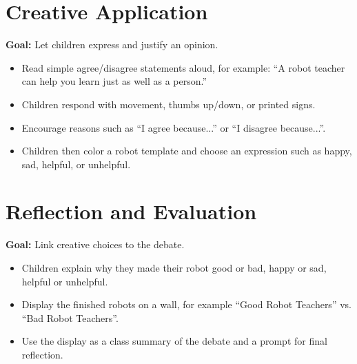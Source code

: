 \documentclass[11pt, a4paper]{article}
\begin{document}
\section{Creative Application}
\textbf{Goal:} Let children express and justify an opinion.
\begin{itemize}
    \item Read simple agree/disagree statements aloud, for example: ``A robot teacher can help you learn just as well as a person.''
    \item Children respond with movement, thumbs up/down, or printed signs.
    \item Encourage reasons such as ``I agree because...'' or ``I disagree because...''.
    \item Children then color a robot template and choose an expression such as happy, sad, helpful, or unhelpful.
\end{itemize}

\section{Reflection and Evaluation}
\textbf{Goal:} Link creative choices to the debate.
\begin{itemize}
    \item Children explain why they made their robot good or bad, happy or sad, helpful or unhelpful.
    \item Display the finished robots on a wall, for example ``Good Robot Teachers'' vs. ``Bad Robot Teachers''.
    \item Use the display as a class summary of the debate and a prompt for final reflection.
\end{itemize}
\end{document}
